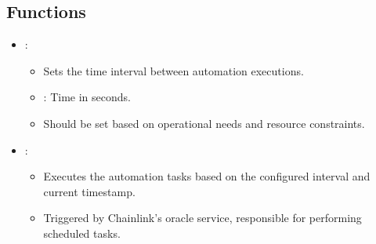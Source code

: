 \documentclass[a4paper,10pt,english]{sphinxmanual}
\begin{document}
\subsection{Functions}
\label{\detokenize{docs_chainlink_automation_contract:functions}}\begin{itemize}
\item {} 
\sphinxAtStartPar
{}:

\begin{sphinxVerbatim}[commandchars=\\\{\}]
\end{sphinxVerbatim}
\begin{itemize}
\item {} 
\sphinxAtStartPar
{} Sets the time interval between automation executions.

\item {} 
\sphinxAtStartPar
{}
\sphinxhyphen{} : Time in seconds.

\item {} 
\sphinxAtStartPar
{} Should be set based on operational needs and resource constraints.

\end{itemize}

\item {} 
\sphinxAtStartPar
{}:

\begin{sphinxVerbatim}[commandchars=\\\{\}]
\end{sphinxVerbatim}
\begin{itemize}
\item {} 
\sphinxAtStartPar
{} Executes the automation tasks based on the configured interval and current timestamp.

\item {} 
\sphinxAtStartPar
{} Triggered by Chainlink’s oracle service, responsible for performing scheduled tasks.

\end{itemize}


\end{itemize}
\end{document}
